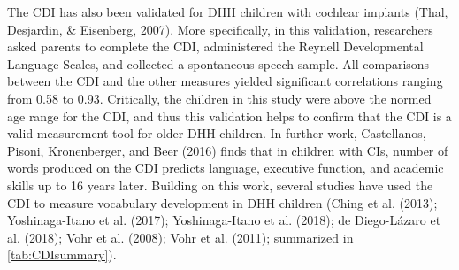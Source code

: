 \documentclass[english,man]{apa6}
\begin{document}
The CDI has also been validated for DHH children with cochlear implants (Thal, Desjardin, \& Eisenberg, 2007). More specifically, in this validation, researchers asked parents to complete the CDI, administered the Reynell Developmental Language Scales, and collected a spontaneous speech sample. All comparisons between the CDI and the other measures yielded significant correlations ranging from 0.58 to 0.93. Critically, the children in this study were above the normed age range for the CDI, and thus this validation helps to confirm that the CDI is a valid measurement tool for older DHH children. In further work, Castellanos, Pisoni, Kronenberger, and Beer (2016) finds that in children with CIs, number of words produced on the CDI predicts language, executive function, and academic skills up to 16 years later. Building on this work, several studies have used the CDI to measure vocabulary development in DHH children (Ching et al. (2013); Yoshinaga-Itano et al. (2017); Yoshinaga-Itano et al. (2018); de Diego-Lázaro et al. (2018); Vohr et al. (2008); Vohr et al. (2011); summarized in \ref{tab:CDIsummary}).

\begin{table}

\caption{\label{tab:CDIsummary}Summary of findings of CDI studies in DHH children}
\centering
{}
\end{table}
\end{document}
